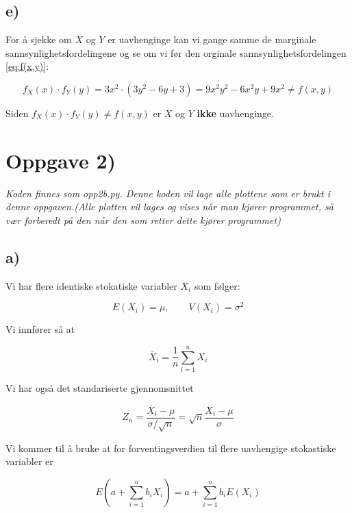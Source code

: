 \documentclass[a4paper,norsk, 10pt]{article}
\begin{document}
\subsection*{e)}

For å sjekke om $X$ og $Y$ er uavhenginge kan vi gange samme de marginale sannsynlighetsfordelingene og se om vi før den orginale sannsynlighetsfordelingen \eqref{eq:f(x,y)}:

\begin{equation}
f_X(x)\cdot f_Y(y) = 3x^2\cdot(3y^2 -6y +3) = 9x^2y^2 -6x^2y + 9x^2 \neq f(x,y)
\end{equation} 

Siden $f_X(x)\cdot f_Y(y) \neq f(x,y) $ er $X$ og $Y$  \textbf{ikke} uavhenginge.


\section*{Oppgave 2)}

\textit{Koden finnes som opp2b.py. Denne koden vil lage alle plottene som er brukt i denne oppgaven.(Alle plotten vil lages og vises når man kjører programmet, så vær forberedt på den når den som retter dette kjører programmet)}


\subsection*{a)}

Vi har flere identiske stokatiske variabler $X_i$ som følger: 

\begin{equation}
E(X_i) = \mu, \qquad V(X_i) = \sigma^2
\end{equation}

Vi innfører så at 

\begin{equation}
\overline{X}_i = \frac{1}{n}\sum_{i = 1}^n X_i
\label{eq:manyMean}
\end{equation}

Vi har også det standariserte gjennomsnittet

\begin{equation}
Z_n = \frac{\overline{X}_i - \mu}{\sigma/\sqrt{n}} = \sqrt{n}\frac{\overline{X}_i - \mu}{\sigma}
\label{eq:stanardMean}
\end{equation}

Vi kommer til å bruke at for forventingsverdien til flere uavhengige stokastiske variabler er

\begin{equation}
E\left(a + \sum_{i = 1}^n b_i X_i\right) = a + \sum_{i = 1}^n b_i E(X_i)
\label{eq:Elinear}
\end{equation}
\end{document}
